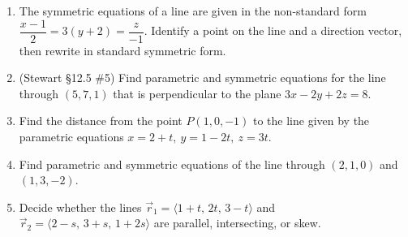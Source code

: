 \documentclass[12pt]{article}
\begin{document}
\begin{enumerate}
\begin{enumerate}
        \item The symmetric equations of a line are given in the non-standard form $\dfrac{x-1}{2} = 3(y+2) = \dfrac{z}{-1}$. Identify a point on the line and a direction vector, then rewrite in standard symmetric form.
        \item (Stewart \S12.5 \#5) Find parametric and symmetric equations for the line through $(5,7,1)$ that is perpendicular to the plane $3x - 2y + 2z = 8$.
        \item Find the distance from the point $P(1, 0, -1)$ to the line given by the parametric equations $x = 2 + t, \ y = 1 - 2t, \ z = 3t$.
        \item Find parametric and symmetric equations of the line through $(2,1,0)$ and $(1,3,-2)$.
        \item Decide whether the lines $\vec r_1=\langle 1+t,\,2t,\,3-t\rangle$ and $\vec r_2=\langle 2-s,\,3+s,\,1+2s\rangle$ are parallel, intersecting, or skew.
    \end{enumerate}
\newpage


\end{enumerate}
\end{document}
